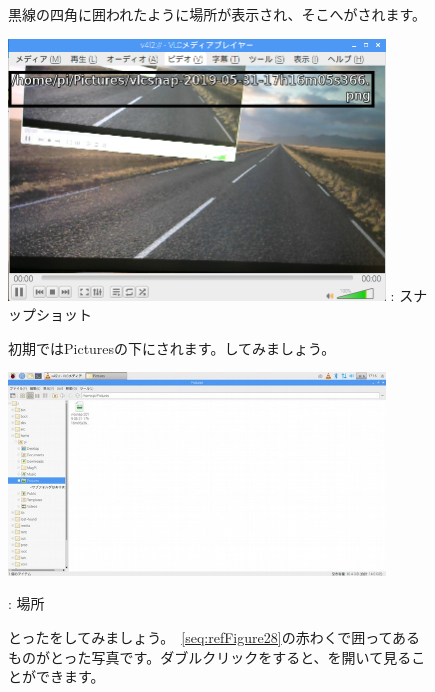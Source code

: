 \documentclass[a4paper,12pt]{jarticle}
\begin{document}
\clearpage
\begin{figure}
  黒線の四角に囲われたように場所が表示され、そこへがされます。

  \centering
  \begin{minipage}{10cm}
    \includegraphics[width=10cm]{textbook-img120.png}
    : スナップショット
  \end{minipage}



  \bigskip
  \flushleft

  初期ではPicturesの下にされます。してみましょう。



  \centering
  \begin{minipage}{10cm}
    \includegraphics[width=10cm]{textbook-img121.jpg}

    : 場所
  \end{minipage}


  \bigskip

  \flushleft
  とったをしてみましょう。~\ref{seq:refFigure28}の赤わくで囲ってあるものがとった写真です。ダブルクリックをすると、を開いて見ることができます。




\end{figure}
\end{document}
